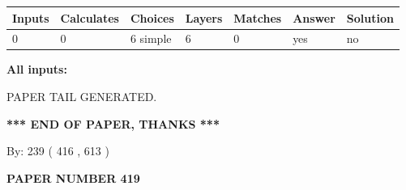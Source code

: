 \documentclass[12pt]{article}
\begin{document}
 
\noindent{}
 
 
   
   
   
   
\noindent\begin{tabular}{|l|l|l|l|l|l|l|}
 \hline
Inputs & Calculates & Choices & Layers & Matches & Answer & Solution \\ \hline
 0  & 
 0  & 
 6
  simple  
  & 
 6  & 
 0  & 
  yes & 
  no 
  \\ \hline
 \end{tabular}
   
   
   
   
\noindent{}
   
   
   
   
\noindent\vspace{0.1in}\hspace{-0.08in} {\textbf{\Large{All inputs: }}}
   
   
   
   
   
   
 \vspace{0.2in}
 
   
   
\vspace{2.0in} PAPER TAIL GENERATED.
   
   
   
   
\vspace{1.0in} 
{\textbf{\large{ *** END OF PAPER, THANKS *** }}} 
   
   
\hspace{1.0in} By: 
 239 ( 416 ,  613 )
   
   
   
   
\newpage 
\setcounter{page}{ 
   419001 } 
   
   
   
   
 {\textbf{ \Large{ PAPER NUMBER  419  }}}
   
   
\vspace{0.2in}
   
   
   
   
   
   
   
   
 \vspace{0.2in}
 
\end{document}
